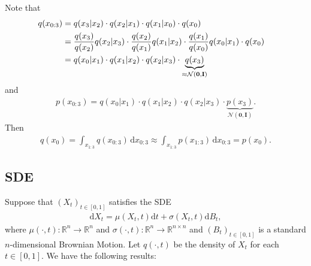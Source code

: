 \documentclass[
]{article}
\theoremstyle{remark}
\begin{document}
Note that \[
\begin{aligned}
  q(x_{0:3}) 
  &= q(x_3\vert x_2) \cdot q(x_2\vert x_1) \cdot q(x_1\vert x_0) \cdot q(x_0) \cr 
  &= \frac{q(x_3)}{q(x_2)}q(x_2\vert x_3) \cdot \frac{q(x_2)}{q(x_1)}q(x_1\vert x_2)\cdot \frac{q(x_1)}{q(x_0)} q(x_0\vert x_1) \cdot q(x_0) \cr 
  &= q(x_0\vert x_1) \cdot q(x_1\vert x_2) \cdot q(x_2\vert x_3) \cdot \underbrace{q(x_3)}_{\approx \mathcal{N}(\mathbf{0},\mathbf{I})}
\end{aligned}
\] and \[
\begin{aligned}
  p(x_{0:3}) = q(x_0\vert x_1) \cdot q(x_1\vert x_2) \cdot q(x_2\vert x_3) \cdot \underbrace{p(x_3)}_{\mathcal{N}(\mathbf{0},\mathbf{I})}.
\end{aligned}
\] Then \[
\begin{aligned}
  q(x_0) = \int_{x_{1:3}} q(x_{0:3}) \, \mathrm{d}x_{0:3} \approx \int_{x_{1:3}} p(x_{1:3}) \, \mathrm{d}x_{0:3} = p(x_0).
\end{aligned}
\]

\subsection{SDE}\label{sde}

Suppose that \((X_t)_{t\in [0,1]}\) satisfies the SDE \[
\begin{aligned}
  \mathrm{d} X_t = \mu(X_t,t) \mathrm{d}t + \sigma(X_t,t) \mathrm{d}B_t,
\end{aligned}
\] where \(\mu(\cdot ,t):\mathbb R^n\longrightarrow \mathbb R^n\) and
\(\sigma(\cdot ,t): \mathbb R^n \longrightarrow \mathbb R^{n\times n}\)
and \((B_t)_{t\in [0,1]}\) is a standard \(n\)-dimensional Brownian
Motion. Let \(q(\cdot , t)\) be the density of \(X_t\) for each
\(t\in [0,1].\) We have the following results:
\end{document}
